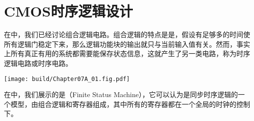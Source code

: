 \chapter{CMOS时序逻辑设计}
在中，我们已经讨论组合逻辑电路。组合逻辑的特点是是，假设有足够多的时间使所有逻辑门稳定下来，那么逻辑功能块的输出就只与当前输入值有关。然而，事实上所有真正有用的系统都需要能保存状态信息，这就产生了另一类电路，称为时序逻辑电路或时序电路。

\begin{Figure}[有限状态机]
    \texttt{[image: build/Chapter07A\_01.fig.pdf]}
\end{Figure}

在中，我们展示的是（Finite Status Machine），它可以认为是同步时序逻辑的一个模型，由组合逻辑和寄存器组成，其中所有的寄存器都在一个全局的时钟的控制下。




